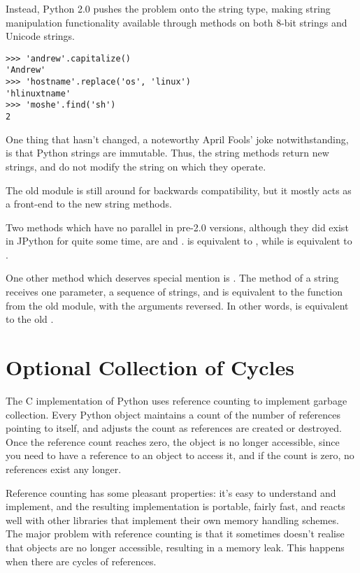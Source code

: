 \documentclass{howto}
\begin{document}
Instead, Python 2.0 pushes the problem onto the string type, making
string manipulation functionality available through methods on both
8-bit strings and Unicode strings.  

\begin{verbatim}
>>> 'andrew'.capitalize()
'Andrew'
>>> 'hostname'.replace('os', 'linux')
'hlinuxtname'
>>> 'moshe'.find('sh')
2
\end{verbatim}

One thing that hasn't changed, a noteworthy April Fools' joke
notwithstanding, is that Python strings are immutable. Thus, the
string methods return new strings, and do not modify the string on
which they operate.

The old  module is still around for backwards
compatibility, but it mostly acts as a front-end to the new string
methods.

Two methods which have no parallel in pre-2.0 versions, although they
did exist in JPython for quite some time, are 
and .   is equivalent to , while  is equivalent to .

One other method which deserves special mention is .  The
 method of a string receives one parameter, a sequence of
strings, and is equivalent to the  function from
the old  module, with the arguments reversed. In other
words,  is equivalent to the old
.

\section{Optional Collection of Cycles}

The C implementation of Python uses reference counting to implement
garbage collection.  Every Python object maintains a count of the
number of references pointing to itself, and adjusts the count as
references are created or destroyed.  Once the reference count reaches
zero, the object is no longer accessible, since you need to have a
reference to an object to access it, and if the count is zero, no
references exist any longer.  

Reference counting has some pleasant properties: it's easy to
understand and implement, and the resulting implementation is
portable, fairly fast, and reacts well with other libraries that
implement their own memory handling schemes.  The major problem with
reference counting is that it sometimes doesn't realise that objects
are no longer accessible, resulting in a memory leak.  This happens
when there are cycles of references.
\end{document}
